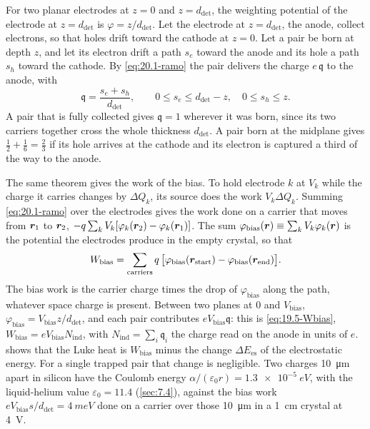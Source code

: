 For two planar electrodes at $z = 0$ and $z = d_{\mathrm{det}}$, the weighting potential of the electrode at $z = d_{\mathrm{det}}$ is $\varphi = z/d_{\mathrm{det}}$. Let the electrode at $z = d_{\mathrm{det}}$, the anode, collect electrons, so that holes drift toward the cathode at $z = 0$. Let a pair be born at depth $z$, and let its electron drift a path $s_e$ toward the anode and its hole a path $s_h$ toward the cathode. By \cref{eq:20.1-ramo} the pair delivers the charge $e\,\mathfrak{q}$ to the anode, with
\begin{equation}
  \mathfrak{q} = \frac{s_e + s_h}{d_{\mathrm{det}}} , \qquad 0 \le s_e \le d_{\mathrm{det}} - z, \quad 0 \le s_h \le z .
  \label{eq:20.1-qpair}
\end{equation}
A pair that is fully collected gives $\mathfrak{q} = 1$ wherever it was born, since its two carriers together cross the whole thickness $d_{\mathrm{det}}$. A pair born at the midplane gives $\frac12 + \frac16 = \frac23$ if its hole arrives at the cathode and its electron is captured a third of the way to the anode.

The same theorem gives the work of the bias. To hold electrode $k$ at $V_k$ while the charge it carries changes by $\Delta Q_k$, its source does the work $V_k\Delta Q_k$. Summing \cref{eq:20.1-ramo} over the electrodes gives the work done on a carrier that moves from $\bm{r}_1$ to $\bm{r}_2$, $-q\sum_kV_k[\varphi_k(\bm{r}_2) - \varphi_k(\bm{r}_1)]$. The sum $\varphi_{\mathrm{bias}}(\bm{r}) \equiv \sum_kV_k\varphi_k(\bm{r})$ is the potential the electrodes produce in the empty crystal, so that
\begin{equation}
  W_{\mathrm{bias}} = \sum_{\text{carriers}} q\,\bigl[\varphi_{\mathrm{bias}}(\bm{r}_{\mathrm{start}}) - \varphi_{\mathrm{bias}}(\bm{r}_{\mathrm{end}})\bigr] .
  \label{eq:20.1-work}
\end{equation}
The bias work is the carrier charge times the drop of $\varphi_{\mathrm{bias}}$ along the path, whatever space charge is present. Between two planes at $0$ and $V_{\mathrm{bias}}$, $\varphi_{\mathrm{bias}} = V_{\mathrm{bias}}z/d_{\mathrm{det}}$, and each pair contributes $eV_{\mathrm{bias}}\mathfrak{q}$: this is \cref{eq:19.5-Wbias}, $W_{\mathrm{bias}} = eV_{\mathrm{bias}}N_{\mathrm{ind}}$, with $N_{\mathrm{ind}} = \sum_i\mathfrak{q}_i$ the charge read on the anode in units of $e$.  shows that the Luke heat is $W_{\mathrm{bias}}$ minus the change $\Delta E_{\mathrm{es}}$ of the electrostatic energy. For a single trapped pair that change is negligible. Two charges \SI{10}{\micro m} apart in silicon have the Coulomb energy $\alpha/(\varepsilon_0r) = \SI{1.3e-5}{eV}$, with the liquid-helium value $\varepsilon_0 = 11.4$ (\cref{sec:7.4}), against the bias work $eV_{\mathrm{bias}}s/d_{\mathrm{det}} = \SI{4}{meV}$ done on a carrier over those \SI{10}{\micro m} in a \SI{1}{cm} crystal at \SI{4}{V}.

